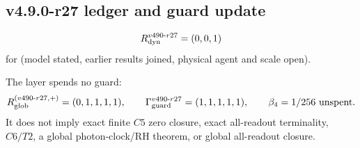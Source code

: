 \subsection*{v4.9.0-r27 ledger and guard update}
\label{subsec:v490-r27-ledger-guard}

\[
R_{\rm dyn}^{v490\text{-}r27}=(0,0,1)
\]
for (model stated, earlier results joined, physical agent and scale open).

The layer spends no guard:
\[
R_{\rm glob}^{(v490\text{-}r27,+)}=(0,1,1,1,1),
\qquad
\Gamma_{\rm guard}^{v490\text{-}r27}=(1,1,1,1,1),
\qquad
\beta_4=1/256\ \text{unspent}.
\]
It does not imply exact finite \(C5\) zero closure, exact all-readout terminality,
\(C6/T2\), a global photon-clock/RH theorem, or global all-readout closure.

